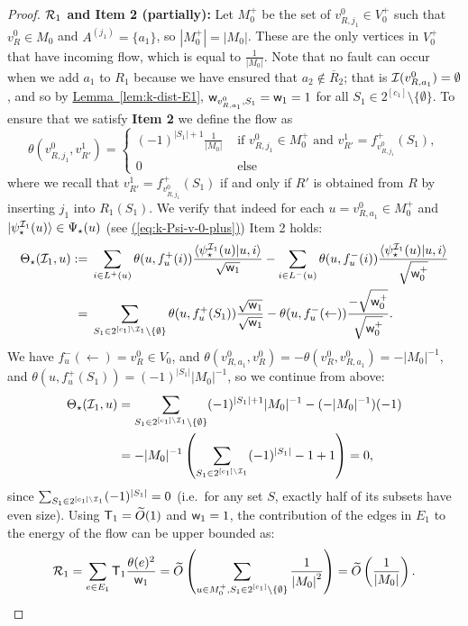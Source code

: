 \documentclass{article}
\newcommand{\eq}[1]{\hyperref[eq:#1]{(\ref*{eq:#1})}}
\newcommand{\lem}[1]{\hyperref[lem:#1]{Lemma~\ref*{lem:#1}}}
\def\ket#1{{\lvert}#1\rangle}
\renewcommand{\>}{\rangle}
\newcommand{\<}{\langle}
\renewcommand{\(}{\left(}
\renewcommand{\)}{\right)}
\def\braket#1#2{{{\langle}#1\vert}#2\rangle}
\def\abs#1{\left| #1 \right|}
\def\w{{\sf w}}
\begin{document}
\begin{proof}
\vskip7pt		
\noindent\textbf{${\cal R}_1$ and Item 2 (partially):} Let $M_0^+$ be the set of $v^{0}_{R,j_1} \in V_0^+$ such that $v^{0}_{R}\in M_0$ and $A^{(j_1)}=\{a_1\}$, so $\abs{M_0^+}=\abs{M_0}$. These are the only vertices in $V_0^+$ that have incoming flow, which is equal to $\frac{1}{\abs{M_0}}$. Note that no fault can occur when we add $a_1$ to $R_1$ because we have ensured that $a_2\not\in \overline{R}_2$; that is ${\cal I}(v^0_{R,a_1})=\emptyset$, and so by \lem{k-dist-E1}, $\w_{v^0_{R,a_1},S_1}=\w_1=1$ for all $S_1\in 2^{[c_1]}\setminus\{\emptyset\}$. 
To ensure that we satisfy \textbf{Item 2} we define the flow as
		$$\theta(v^0_{R,j_1},v^1_{R'}) = \begin{cases}
			(-1)^{\abs{S_1}+1}\frac{1}{\abs{M_0}} &\text{ if } v^0_{R,j_1} \in M_0^+\mbox{ and }v_{R'}^1=f^+_{v_{R,j_1}^0}(S_1),\\
			0 &\text{ else}
		\end{cases}$$
where we recall that $v_{R'}^1=f^+_{v_{R,j_1}^0}(S_1)$ if and only if $R'$ is obtained from $R$ by inserting $j_1$ into $R_1(S_1)$. 
		We verify that indeed for each $u=v_{R,a_1}^0 \in M_0^+$ and $\ket{\psi^{{\cal I}_1}_\star(u)}\in \Psi_\star(u)$ (see \eq{k-Psi-v-0-plus}) Item 2 holds:
\begin{equation}
\begin{split}
\Theta_\star({\cal I}_1,u):={}&\sum_{i\in L^+(u)}\theta(u,f^+_{u}(i))\frac{\braket{\psi_\star^{{\cal I}_1}(u)}{u,i}}{\sqrt{\w_1}}-\sum_{i\in L^-(u)}\theta(u,f^-_{u}(i))\frac{\braket{\psi_\star^{{\cal I}_1}(u)}{u,i}}{\sqrt{\w_0^+}}\\
={}& \sum_{S_1 \in 2^{[c_1]\setminus {\cal I}_1} \setminus \{\emptyset\}}\theta(u,f^+_{u}(S_1))\frac{\sqrt{\w_1}}{\sqrt{\w_1}}-\theta(u,f^-_{u}(\leftarrow))\frac{-\sqrt{\w_0^+}}{\sqrt{\w_0^+}}.
\end{split}\label{eq:k-dist-pos-flow-1}
\end{equation}
We have $f^-_u(\leftarrow)=v_R^0\in V_0$, and $\theta(v_{R,a_1}^0,v_R^0)=-\theta(v_R^0,v_{R,a_1}^0)=-|M_0|^{-1}$, and $\theta(u,f^+_u(S_1))=(-1)^{|S_1|}|M_0|^{-1}$, so we continue from above:
\begin{equation}
\begin{split}
\Theta_\star({\cal I}_1,u)&= \sum_{S_1 \in 2^{[c_1]\setminus {\cal I}_1} \setminus \{\emptyset\}}(-1)^{|S_1|+1}|M_0|^{-1}-(-|M_0|^{-1})(-1)\\
&= -|M_0|^{-1}\left(\sum_{S_1\in 2^{[c_1]\setminus {\cal I}_1}}(-1)^{|S_1|}-1+1 \right)=0,
\end{split}\label{eq:k-dist-pos-flow-2}
\end{equation}
since $\sum_{S_1\in 2^{[c_1]\setminus {\cal I}_1}}(-1)^{|S_1|}=0$ (i.e.~for any set $S$, exactly half of its subsets have even size). 
Using ${\sf T}_1=\widetilde{O}(1)$ and ${\sf w}_1=1$, the contribution of the edges in $E_1$ to the energy of the flow can be upper bounded as:
		\begin{equation}
			{\cal R}_1 = \sum_{e\in E_1}{\sf T}_1\frac{\theta(e)^2}{\w_1} = \widetilde{O}\left(\sum_{\substack{u \in M_0^+, S_1 \in 2^{[c_1]} \setminus \{\emptyset\}}}\frac{1}{\abs{M_0}^2}\right)=\widetilde{O}\left(\frac{1}{\abs{M_0}}\right).\label{eq:k-R1}
		\end{equation}
		

\end{proof}
\end{document}
